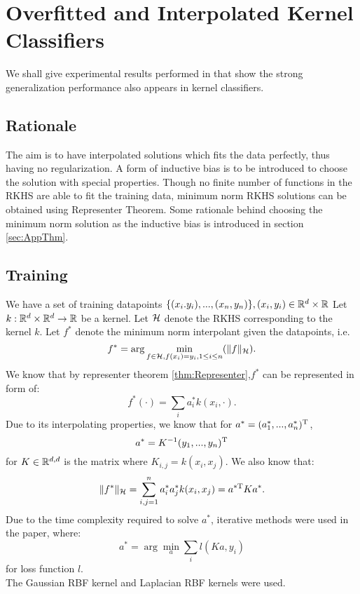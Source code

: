 \documentclass[twoside]{memoir}
\begin{document}
\chapter{Overfitted and Interpolated Kernel Classifiers}
We shall give experimental results performed in \cite{UnderstandKernel} that show the strong generalization performance also appears in kernel classifiers.
\section{Rationale}
The aim is to have interpolated solutions which fits the data perfectly, thus having no regularization. A form of inductive bias is to be introduced to choose the solution with special properties. Though no finite number of functions in the RKHS are able to fit the training data, minimum norm RKHS solutions can be obtained using Representer Theorem. Some rationale behind choosing the minimum norm solution as the inductive bias is introduced in section \ref{sec:AppThm}.
\section{Training}
We have a set of training datapoints $\{ (x_i. y_i), ..., (x_n, y_n) \}, (x_i, y_i) \in \mathbb{R}^d \times \mathbb{R}$
Let $k: \mathbb{R}^d \times \mathbb{R}^d \rightarrow \mathbb{R}$ be a kernel. Let $\mathcal{H}$ denote the RKHS corresponding to the kernel $k$. Let $f^*$ denote the minimum norm interpolant given the datapoints, i.e.
\begin{equation*}
f^* = \arg \min_{f \in \mathcal{H}, f(x_i) = y_i, 1 \leq i \leq n} (\lVert f\rVert_{\mathcal{H}}).
\end{equation*}
We know that by representer theorem \ref{thm:Representer},$f^*$ can be represented in form of:
\[ f^*(\cdot) = \sum_{i} a^*_i k(x_i, \cdot). \]
Due to its interpolating properties, we know that for $a^* = (a^*_1, ..., a^*_n)^{\text{T}}$,
\begin{equation} \label{eqn:interpolation_solution}
a^* = K^{-1} (y_1, ..., y_n)^{\text{T}}
\end{equation}
for $K \in \mathbb{R}^{d,d}$ is the matrix where $K_{i,j} = k(x_i, x_j)$.
We also know that:
\[ \lVert f^*\rVert_{\mathcal{H}} = \sum_{i,j=1}^{n} a^*_i a^*_j k(x_i, x_j) = a^{*\text{T}} K a^*. \]
Due to the time complexity required to solve $a^*$, iterative methods were used in the paper, where:
\begin{equation*}
a^* = \arg \min_{a} \sum_{i} l(Ka, y_i)
\end{equation*}
for loss function $l$.\\
The Gaussian RBF kernel and Laplacian RBF kernels were used.
\end{document}
